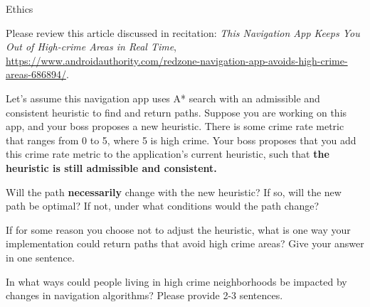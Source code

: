 \begin{problem}{Ethics}

\begin{question}[3]
Please review this article discussed in recitation: \textit{This Navigation App Keeps You Out of High-crime Areas in Real Time},\\ \url{https://www.androidauthority.com/redzone-navigation-app-avoids-high-crime-areas-686894/}.

\begin{subquestion}[1]
Let's assume this navigation app uses A* search with an admissible and consistent heuristic to find and return paths.
Suppose you are working on this app, and your boss proposes a new heuristic.
There is some crime rate metric that ranges from 0 to 5, where 5 is high crime. 
Your boss proposes that you add this crime rate metric to the application's current heuristic, such that \textbf{the heuristic is still admissible and consistent.}

Will the path \textbf{necessarily} change with the new heuristic? If so, will the new path be optimal? If not, under what conditions would the path change?
 
\end{subquestion}

\begin{subquestion}[1]
If for some reason you choose not to adjust the heuristic, what is one way your implementation could return paths that avoid high crime areas? Give your answer in one sentence.


\end{subquestion}

\begin{subquestion}[1]
In what ways could people living in high crime neighborhoods be impacted by changes in navigation algorithms? Please provide 2-3 sentences.

\end{subquestion}

\end{question}

\end{problem}